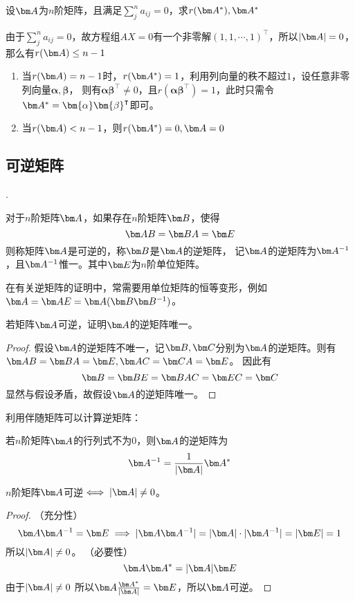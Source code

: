\begin{example}
    设$\mat{A}$为$n$阶矩阵，且满足$\sum_j^n a_{ij} = 0$，求$r(\mat{A}^*),\mat{A}^*$
\end{example}
\begin{solution}
    由于$\sum_j^n a_{ij} = 0$，故方程组$AX=0$有一个非零解$(1,1,\cdots,1)^\intercal$，所以$|\mat{A}|=0$，那么有$r(\mat{A})\leq n-1$
    \begin{enumerate}[(1)]
        \item 当$r(\mat{A})=n-1$时，$r(\mat{A}^*)=1$，利用列向量的秩不超过$1$，设任意非零列向量$\bm{\alpha},\bm{\beta}$，
              则有$\bm{\alpha}\bm{\beta}^\intercal\neq 0$，且$r(\bm{\alpha}\bm{\beta}^\intercal)=1$，此时只需令$\mat{A}^*=\bm{\alpha}\bm{\beta}^\intercal$即可。
        \item 当$r(\mat{A})<n-1$，则$r(\mat{A}^*)=0,\mat{A}=0$
    \end{enumerate}
\end{solution}

\subsection{可逆矩阵}
.
\begin{definition}
    对于$n$阶矩阵$\mat{A}$，如果存在$n$阶矩阵$\mat{B}$，使得
    \[ \mat{AB} = \mat{BA} = \mat{E} \]
    则称矩阵$\mat{A}$是可逆的，称$\mat{B}$是$\mat{A}$的逆矩阵，
    记$\mat{A}$的逆矩阵为$\mat{A}^{-1}$，且$\mat{A}^{-1}$惟一。其中$\mat{E}$为$n$阶单位矩阵。
\end{definition}
在有关逆矩阵的证明中，常需要用单位矩阵的恒等变形，例如$\mat{A}=\mat{AE}=\mat{A}(\mat{B}\mat{B}^{-1})$。
\begin{example}
    若矩阵$\mat{A}$可逆，证明$\mat{A}$的逆矩阵唯一。
\end{example}
\begin{proof}
    假设$\mat{A}$的逆矩阵不唯一，记$\mat{B},\mat{C}$分别为$\mat{A}$的逆矩阵。则有$\mat{AB}=\mat{BA}=\mat{E}, \mat{AC}=\mat{CA}=\mat{E}$。
    因此有
    \[ \mat{B} = \mat{BE} = \mat{BAC} = \mat{EC} = \mat{C} \]
    显然与假设矛盾，故假设$\mat{A}$的逆矩阵唯一。
\end{proof}

利用伴随矩阵可以计算逆矩阵：
\begin{theorem}
    若$n$阶矩阵$\mat{A}$的行列式不为$0$，则$\mat{A}$的逆矩阵为
    \[
        \mat{A}^{-1} = \frac{1}{|\mat{A}|}\mat{A}^*
    \]
\end{theorem}

\begin{theorem}
    $n$阶矩阵$\mat{A}$可逆$\iff |\mat{A}|\neq 0$。
\end{theorem}
\begin{proof}
    （充分性）
    \[ \mat{A}\mat{A}^{-1} = \mat{E} \implies |\mat{A}\mat{A}^{-1}| = |\mat{A}|\cdot|\mat{A}^{-1}| = |\mat{E}| = 1 \]
    所以$|\mat{A}|\neq 0$。
    （必要性）
    \[ \mat{A}\mat{A}^* = |\mat{A}|\mat{E} \]
    由于$|\mat{A}|\neq 0$
    所以$\mat{A} \frac{\mat{A}^*}{|\mat{A}|} = \mat{E}$，所以$\mat{A}$可逆。
\end{proof}

